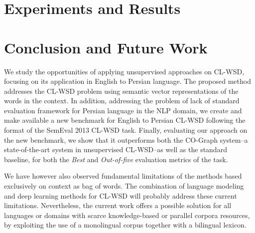 \documentclass[11pt]{article}
\begin{document}
\section{Experiments and Results}
\vspace{-0.2cm}
\label{sec:experiments}

\vspace{-0.3cm}

\section{Conclusion and Future Work}
\vspace{-0.3cm}
\label{sec:conclusion}
We study the opportunities of applying unsupervised approaches on CL-WSD, focusing on its application in English to Persian language. The proposed method  addresses the CL-WSD problem using semantic vector representations of the words in the context. In addition, addressing the problem of lack of standard evaluation framework for Persian language in the NLP domain, we create and make available a new benchmark for English to Persian CL-WSD following the format of the SemEval 2013 CL-WSD task. Finally, evaluating our approach on the new benchmark, we show that it outperforms both the CO-Graph system--a state-of-the-art system in unsupervised CL-WSD--as well as the standard baseline, for both the \emph{Best} and \emph{Out-of-five} evaluation metrics of the task.  

We have however also observed fundamental limitations of the methods based exclusively on context as bag of words. The combination of  language modeling and deep learning methods for CL-WSD will probably address these current limitations. Nevertheless, the current work offers a possible solution for all languages or domains with scarce knowledge-based  or parallel corpora resources, by exploiting the use of a monolingual corpus together with a bilingual lexicon.



\end{document}

